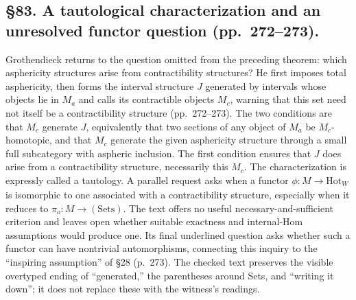 \documentclass[10pt,oneside]{book}
\begin{document}
\subsection*{\S83. A tautological characterization and an unresolved functor question (pp.\ 272--273).}
Grothendieck returns to the question omitted from the preceding theorem: which asphericity structures arise from contractibility structures? He first imposes total asphericity, then forms the interval structure $J$ generated by intervals whose objects lie in $M_a$ and calls its contractible objects $M_c$, warning that this set need not itself be a contractibility structure (pp.\ 272--273). The two conditions are that $M_c$ generate $J$, equivalently that two sections of any object of $M_a$ be $M_c$-homotopic, and that $M_c$ generate the given asphericity structure through a small full subcategory with aspheric inclusion. The first condition ensures that $J$ does arise from a contractibility structure, necessarily this $M_c$. The characterization is expressly called a tautology. A parallel request asks when a functor $\phi:M\to\mathrm{Hot}_{\underline W}$ is isomorphic to one associated with a contractibility structure, especially when it reduces to $\pi_o:M\to(\mathrm{Sets})$. The text offers no useful necessary-and-sufficient criterion and leaves open whether suitable exactness and internal-Hom assumptions would produce one. Its final underlined question asks whether such a functor can have nontrivial automorphisms, connecting this inquiry to the “inspiring assumption” of \S28 (p.\ 273). The checked text preserves the visible overtyped ending of “generated,” the parentheses around Sets, and “writing it down”; it does not replace these with the witness's readings.
\end{document}
